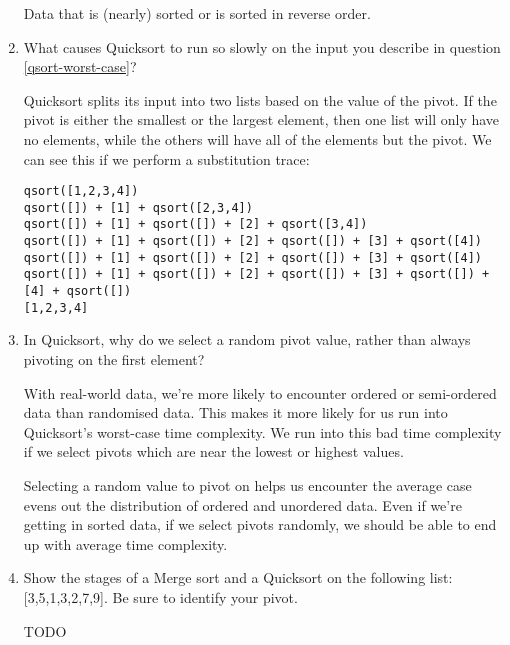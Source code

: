 \documentclass[11pt]{article}
\newenvironment{answer}{\large\lstset{basicstyle=\large}\color{white}}{}
\newenvironment{answer}{\large\lstset{basicstyle=\large}\color{red}}{}
\begin{document}
\begin{enumerate}
      \begin{answer}
      Data that is (nearly) sorted or is sorted in reverse order.
      \end{answer}

\item What causes Quicksort to run so slowly on the input you describe in
      question \ref{qsort-worst-case}?

    \begin{answer}
    Quicksort splits its input into two lists based on the value of the pivot.
    If the pivot is either the smallest or the largest element, then one list
    will only have no elements, while the others will have all of the elements
    but the pivot. We can see this if we perform a substitution trace:

\begin{verbatim}
qsort([1,2,3,4])
qsort([]) + [1] + qsort([2,3,4])
qsort([]) + [1] + qsort([]) + [2] + qsort([3,4])
qsort([]) + [1] + qsort([]) + [2] + qsort([]) + [3] + qsort([4])
qsort([]) + [1] + qsort([]) + [2] + qsort([]) + [3] + qsort([4])
qsort([]) + [1] + qsort([]) + [2] + qsort([]) + [3] + qsort([]) + [4] + qsort([])
[1,2,3,4]
\end{verbatim}
    \end{answer}

\item In Quicksort, why do we select a random pivot value, rather than always
      pivoting on the first element?

      \begin{answer}
      With real-world data, we're more likely to encounter ordered or
      semi-ordered data than randomised data. This makes it more likely for us
      run into Quicksort's worst-case time complexity. We run into this bad
      time complexity if we select pivots which are near the lowest or highest
      values.

      Selecting a random value to pivot on helps us encounter the average case
      evens out the distribution of ordered and unordered data. Even if we're
      getting in sorted data, if we select pivots randomly, we should be able
      to end up with average time complexity.
      \end{answer}

\pagebreak
\item Show the stages of a Merge sort and a Quicksort on the following list:
      [3,5,1,3,2,7,9]. Be sure to identify your pivot.

    \begin{answer}
    \Huge TODO
    \vspace{2in}
    \end{answer}


\end{enumerate}
\end{document}
